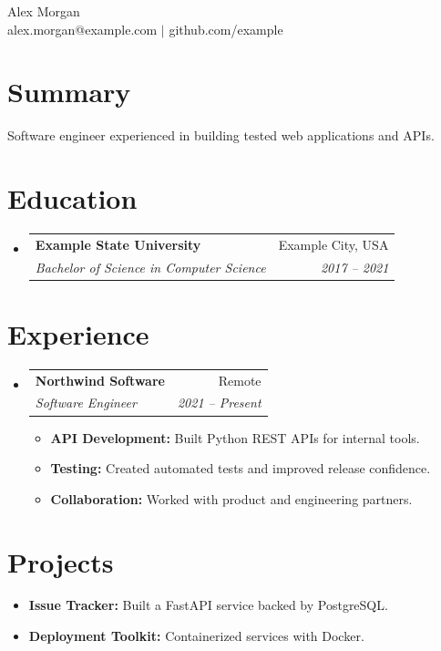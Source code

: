 \documentclass[letterpaper,11pt]{article}
\makeatletter
\newcommand{\resumeItem}[2]{
  \item\small{\textbf{#1} #2}
}
\newcommand{\resumeSubheading}[4]{
  \Needspace{7\baselineskip}
  \item
  \begin{tabular*}{0.97\textwidth}{l@{\extracolsep{\fill}}r}
    \textbf{#1} & #2 \\
    \textit{#3} & \textit{#4} \\
  \end{tabular*}
}
\newcommand{\resumeSubItem}[2]{\item\small{\textbf{#1} #2}}
\newcommand{\resumeSubHeadingListStart}{\begin{itemize}[leftmargin=*]}
\newcommand{\resumeSubHeadingListEnd}{\end{itemize}}
\newcommand{\resumeItemListStart}{\begin{itemize}}
\newcommand{\resumeItemListEnd}{\end{itemize}}
\makeatother
\begin{document}
\begin{center}
  {\LARGE Alex Morgan} \\
  alex.morgan@example.com $\vert$ github.com/example
\end{center}


\section{Summary}
Software engineer experienced in building tested web applications and APIs.


\section{Education}
\resumeSubHeadingListStart
  \resumeSubheading
    {Example State University}{Example City, USA}
    {Bachelor of Science in Computer Science}{2017 -- 2021}
\resumeSubHeadingListEnd


\section{Experience}
\resumeSubHeadingListStart
  \resumeSubheading
    {Northwind Software}{Remote}
    {Software Engineer}{2021 -- Present}
  \resumeItemListStart
    \resumeItem{API Development:}{Built Python REST APIs for internal tools.}
    \resumeItem{Testing:}{Created automated tests and improved release confidence.}
    \resumeItem{Collaboration:}{Worked with product and engineering partners.}
  \resumeItemListEnd
\resumeSubHeadingListEnd


\section{Projects}
\resumeSubHeadingListStart
  \resumeSubItem{Issue Tracker:}{Built a FastAPI service backed by PostgreSQL.}
  \resumeSubItem{Deployment Toolkit:}{Containerized services with Docker.}
\resumeSubHeadingListEnd

\end{document}
